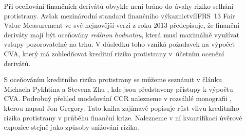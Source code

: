 \documentclass[a4paper,12pt]{report}
\theoremstyle{definition} \newtheorem{definice}[veta]{Definice}
\theoremstyle{remark}
\begin{document}

%


Při oceňování finančních derivátů obvykle není bráno do úvahy riziko selhání protistrany.
Avšak mezinárodní standard finančního výkaznictví\linebreak IFRS~13 Fair Value Measurement \cite{ifrs13} ve své nejnovější verzi z roku 2013 předepisuje, že  finanční deriváty mají být oceňovány \textit{reálnou hodnotou}, která musí maximálně využívat vstupy pozorovatelné na trhu.
V důsledku toho vzniká požadavek na výpočet CVA, který má zohledňovat kreditní riziko protistrany v~účetním ocenění derivátů. %

S oceňováním kreditního rizika protistrany se můžeme seznámit v článku  Michaela Pykhtina a Stevena Zhu \cite{zhu2007}, kde jsou představeny přístupy k výpočtu CVA.
Podrobný přehled modelování CCR nalezneme v rozsáhlé monografii \cite{gregory2010}, kterou napsal Jon Gregory.
Tato kniha zajímavě popisuje růst vlivu kreditního rizika protistrany v průběhu finanční krize. 
Nalezneme v ní kvantifikaci úvěrové expozice stejně jako způsoby snižování rizika.
\end{document}
